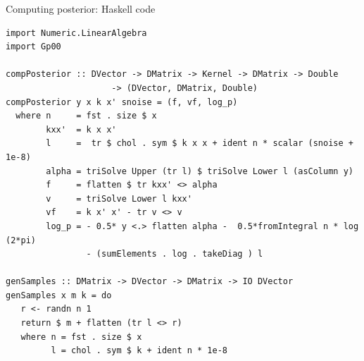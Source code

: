\documentclass[presentation]{beamer}
\begin{document}
\begin{frame}[fragile,label={sec:org9c76473}]{Computing posterior: Haskell code}
 \begin{verbatim}
import Numeric.LinearAlgebra
import Gp00

compPosterior :: DVector -> DMatrix -> Kernel -> DMatrix -> Double 
                     -> (DVector, DMatrix, Double)
compPosterior y x k x' snoise = (f, vf, log_p) 
  where n     = fst . size $ x
        kxx'  = k x x'
        l     =  tr $ chol . sym $ k x x + ident n * scalar (snoise + 1e-8)
        alpha = triSolve Upper (tr l) $ triSolve Lower l (asColumn y)
        f     = flatten $ tr kxx' <> alpha
        v     = triSolve Lower l kxx'
        vf    = k x' x' - tr v <> v
        log_p = - 0.5* y <.> flatten alpha -  0.5*fromIntegral n * log (2*pi) 
                - (sumElements . log . takeDiag ) l 

genSamples :: DMatrix -> DVector -> DMatrix -> IO DVector 
genSamples x m k = do
   r <- randn n 1 
   return $ m + flatten (tr l <> r)
   where n = fst . size $ x
         l = chol . sym $ k + ident n * 1e-8
\end{verbatim}
\end{frame}
\end{document}
